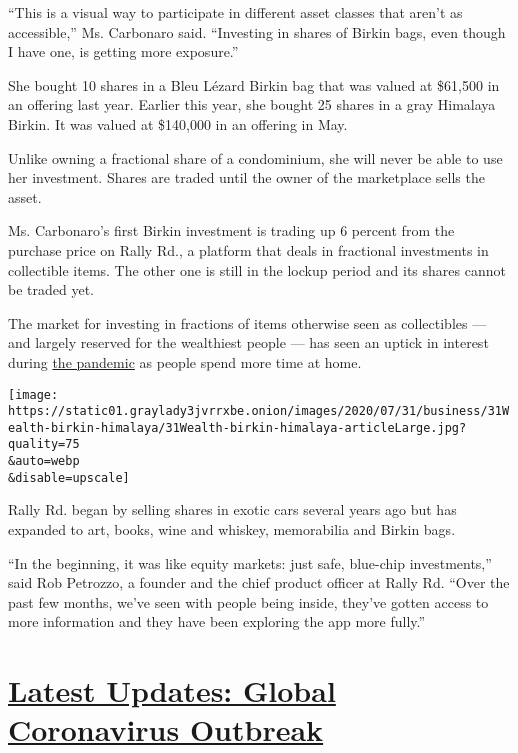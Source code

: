 ``This is a visual way to participate in different asset classes that
aren't as accessible,'' Ms. Carbonaro said. ``Investing in shares of
Birkin bags, even though I have one, is getting more exposure.''

She bought 10 shares in a Bleu Lézard Birkin bag that was valued at
\$61,500 in an offering last year. Earlier this year, she bought 25
shares in a gray Himalaya Birkin. It was valued at \$140,000 in an
offering in May.

Unlike owning a fractional share of a condominium, she will never be
able to use her investment. Shares are traded until the owner of the
marketplace sells the asset.

Ms. Carbonaro's first Birkin investment is trading up 6 percent from the
purchase price on Rally Rd., a platform that deals in fractional
investments in collectible items. The other one is still in the lockup
period and its shares cannot be traded yet.

The market for investing in fractions of items otherwise seen as
collectibles --- and largely reserved for the wealthiest people --- has
seen an uptick in interest during
\href{https://www.nytimes3xbfgragh.onion/news-event/coronavirus}{the
pandemic} as people spend more time at home.

\texttt{[image: https://static01.graylady3jvrrxbe.onion/images/2020/07/31/business/31Wealth-birkin-himalaya/31Wealth-birkin-himalaya-articleLarge.jpg?quality=75\\\&auto=webp\\\&disable=upscale]}

Rally Rd. began by selling shares in exotic cars several years ago but
has expanded to art, books, wine and whiskey, memorabilia and Birkin
bags.

``In the beginning, it was like equity markets: just safe, blue-chip
investments,'' said Rob Petrozzo, a founder and the chief product
officer at Rally Rd. ``Over the past few months, we've seen with people
being inside, they've gotten access to more information and they have
been exploring the app more fully.''

\hypertarget{latest-updates-global-coronavirus-outbreak}{%
\section{\texorpdfstring{\href{https://www.nytimes3xbfgragh.onion/2020/08/01/world/coronavirus-covid-19.html?action=click\&pgtype=Article\&state=default\&region=MAIN_CONTENT_1\&context=storylines_live_updates}{Latest
Updates: Global Coronavirus
Outbreak}}{Latest Updates: Global Coronavirus Outbreak}}\label{latest-updates-global-coronavirus-outbreak}}

